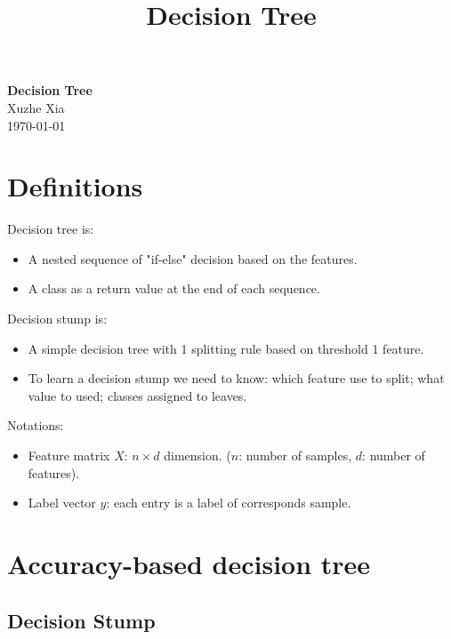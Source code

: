 \documentclass[11pt]{article}
\theoremstyle{definition}
\begin{document}
\setcounter{section}{-1}

\title{Decision Tree}

\thispagestyle{empty}

\begin{center}
{\LARGE \bf Decision Tree}\\
{\large Xuzhe Xia}\\
\today
\end{center}

  
\section{Definitions} \label{sec:}

Decision tree is:
\begin{itemize}
    \item A nested sequence of "if-else" decision based on the features.
    \item A class as a return value at the end of each sequence.
\end{itemize}

Decision stump is:
\begin{itemize}
    \item A simple decision tree with 1 splitting rule based on threshold 1 feature.
    \item To learn a decision stump we need to know: which feature use to split; what value to used; classes assigned to leaves.
\end{itemize}

Notations:
\begin{itemize}
    \item Feature matrix $X$: $n \times d$ dimension. ($n$: number of samples, $d$: number of features).
    \item Label vector $y$: each entry is a label of corresponds sample.
\end{itemize}


\section{Accuracy-based decision tree} \label{sec:}

\subsection{Decision Stump} \label{sec:}
\end{document}

